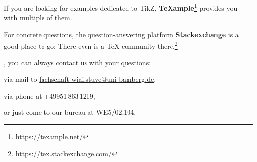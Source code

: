 If you are looking for examples dedicated to TikZ, \textbf{\TeX{}ample}\footnote{\url{https://texample.net/}} provides you with multiple of them.

For concrete questions, the question-answering platform \textbf{Stackexchange} is a good place to go: There even is a \TeX{} community there.\footnote{\url{https://tex.stackexchange.com/}}

, you can always contact us with your questions:
\begin{compactitem}
	\item via mail to \href{mailto:fachschaft-wiai.stuve@uni-bamberg.de}{fachschaft-wiai.stuve@uni-bamberg.de},
	\item via phone at +49951\,863\,1219,
	\item or just come to our bureau at WE5/02.104.
\end{compactitem}

